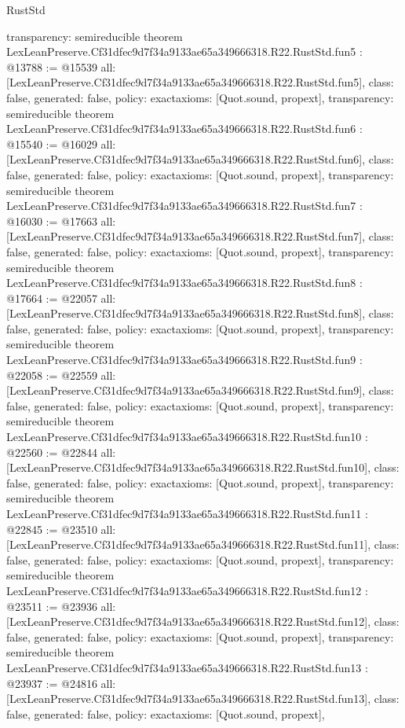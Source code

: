 \begin{lexlean}{RustStd}
\begin{coremodule}
{  transparency: semireducible
}
theorem LexLeanPreserve.Cf31dfec9d7f34a9133ae65a349666318.R22.RustStd.fun5 : @13788 := @15539 {
  all: [LexLeanPreserve.Cf31dfec9d7f34a9133ae65a349666318.R22.RustStd.fun5],
  class: false,
  generated: false,
  policy: exact{axioms: [Quot.sound, propext]},
  transparency: semireducible
}
theorem LexLeanPreserve.Cf31dfec9d7f34a9133ae65a349666318.R22.RustStd.fun6 : @15540 := @16029 {
  all: [LexLeanPreserve.Cf31dfec9d7f34a9133ae65a349666318.R22.RustStd.fun6],
  class: false,
  generated: false,
  policy: exact{axioms: [Quot.sound, propext]},
  transparency: semireducible
}
theorem LexLeanPreserve.Cf31dfec9d7f34a9133ae65a349666318.R22.RustStd.fun7 : @16030 := @17663 {
  all: [LexLeanPreserve.Cf31dfec9d7f34a9133ae65a349666318.R22.RustStd.fun7],
  class: false,
  generated: false,
  policy: exact{axioms: [Quot.sound, propext]},
  transparency: semireducible
}
theorem LexLeanPreserve.Cf31dfec9d7f34a9133ae65a349666318.R22.RustStd.fun8 : @17664 := @22057 {
  all: [LexLeanPreserve.Cf31dfec9d7f34a9133ae65a349666318.R22.RustStd.fun8],
  class: false,
  generated: false,
  policy: exact{axioms: [Quot.sound, propext]},
  transparency: semireducible
}
theorem LexLeanPreserve.Cf31dfec9d7f34a9133ae65a349666318.R22.RustStd.fun9 : @22058 := @22559 {
  all: [LexLeanPreserve.Cf31dfec9d7f34a9133ae65a349666318.R22.RustStd.fun9],
  class: false,
  generated: false,
  policy: exact{axioms: [Quot.sound, propext]},
  transparency: semireducible
}
theorem LexLeanPreserve.Cf31dfec9d7f34a9133ae65a349666318.R22.RustStd.fun10 : @22560 := @22844 {
  all: [LexLeanPreserve.Cf31dfec9d7f34a9133ae65a349666318.R22.RustStd.fun10],
  class: false,
  generated: false,
  policy: exact{axioms: [Quot.sound, propext]},
  transparency: semireducible
}
theorem LexLeanPreserve.Cf31dfec9d7f34a9133ae65a349666318.R22.RustStd.fun11 : @22845 := @23510 {
  all: [LexLeanPreserve.Cf31dfec9d7f34a9133ae65a349666318.R22.RustStd.fun11],
  class: false,
  generated: false,
  policy: exact{axioms: [Quot.sound, propext]},
  transparency: semireducible
}
theorem LexLeanPreserve.Cf31dfec9d7f34a9133ae65a349666318.R22.RustStd.fun12 : @23511 := @23936 {
  all: [LexLeanPreserve.Cf31dfec9d7f34a9133ae65a349666318.R22.RustStd.fun12],
  class: false,
  generated: false,
  policy: exact{axioms: [Quot.sound, propext]},
  transparency: semireducible
}
theorem LexLeanPreserve.Cf31dfec9d7f34a9133ae65a349666318.R22.RustStd.fun13 : @23937 := @24816 {
  all: [LexLeanPreserve.Cf31dfec9d7f34a9133ae65a349666318.R22.RustStd.fun13],
  class: false,
  generated: false,
  policy: exact{axioms: [Quot.sound, propext]},
}
\end{coremodule}
\end{lexlean}
